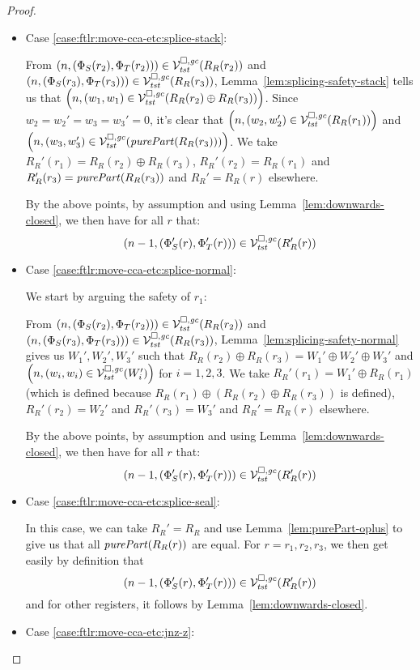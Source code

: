 \begin{proof}
\begin{itemize}
  \item Case \ref{case:ftlr:move-cca-etc:splice-stack}:

    From $\npair{(\Phi_S(r_2),\Phi_T(r_2))} \in \lrvg{\trust}(R_R(r_2))$ and $\npair{(\Phi_S(r_3),\Phi_T(r_3))} \in \lrvg{\trust}(R_R(r_3))$, Lemma~\ref{lem:splicing-safety-stack} tells us that $\npair{(w_1,w_1) \in \lrvg{\trust}(R_R(r_2)\oplus R_R(r_3))}$.
    Since $w_2 = w_2'=w_3=w_3'=0$, it's clear that 
    $\npair{(w_2,w_2') \in \lrvg{\trust}(R_R(r_1))}$ and $\npair{(w_3,w_3') \in \lrvg{\trust}(\purePart{R_R(r_3)})}$.
    We take $R_R'(r_1) = R_R(r_2)\oplus R_R(r_3)$, $R_R'(r_2) = R_R(r_1)$ and $R_R'(r_3) = \purePart{R_R(r_3)}$ and $R_R' = R_R(r)$ elsewhere.

    By the above points, by assumption and using Lemma~\ref{lem:downwards-closed}, we then have for all $r$ that:
    \[
      \npair[n-1]{(\Phi_S'(r), \Phi_T'(r))} \in \lrvg{\trust}(R_R'(r))
    \]

  \item Case \ref{case:ftlr:move-cca-etc:splice-normal}:
    
    We start by arguing the safety of $r_1$:

    From $\npair{(\Phi_S(r_2),\Phi_T(r_2))} \in \lrvg{\trust}(R_R(r_2))$ and $\npair{(\Phi_S(r_3),\Phi_T(r_3))} \in \lrvg{\trust}(R_R(r_3))$, Lemma~\ref{lem:splicing-safety-normal} gives us $W_1',W_2',W_3'$ such that $R_R(r_2)\oplus R_R(r_3) = W_1'\oplus W_2' \oplus W_3'$ and
    $\npair{(w_i,w_i) \in \lrvg{\trust}(W_i')}$ for $i = 1,2,3$.
    We take $R_R'(r_1) = W_1'\oplus R_R(r_1)$ (which is defined because $R_R(r_1) \oplus (R_R(r_2)\oplus R_R(r_3))$ is defined), $R_R'(r_2) = W_2'$ and $R_R'(r_3) = W_3'$ and $R_R' = R_R(r)$ elsewhere.

    By the above points, by assumption and using Lemma~\ref{lem:downwards-closed}, we then have for all $r$ that:
    \[
      \npair[n-1]{(\Phi_S'(r), \Phi_T'(r))} \in \lrvg{\trust}(R_R'(r))
    \]

  \item Case \ref{case:ftlr:move-cca-etc:splice-seal}:

    In this case, we can take $R_R' = R_R$ and use Lemma~\ref{lem:purePart-oplus} to give us that all $\purePart{R_R(r)}$ are equal.
    For $r = r_1, r_2, r_3$, we then get easily by definition that
    \[
      \npair[n-1]{(\Phi_S'(r), \Phi_T'(r))} \in \lrvg{\trust}(R_R'(r))
    \]
    and for other registers, it follows by Lemma~\ref{lem:downwards-closed}.

  \item Case \ref{case:ftlr:move-cca-etc:jnz-z}:


\end{itemize}
\end{proof}
